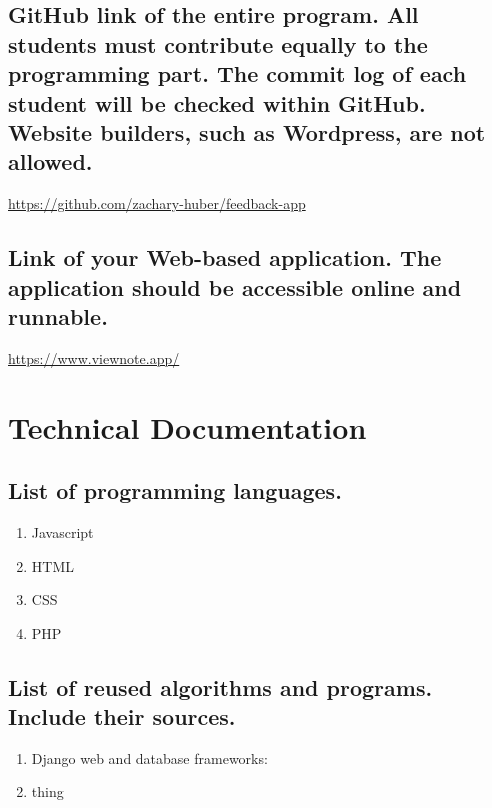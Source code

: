 \documentclass[letterpaper, 12 pt, conference]{ieeeconf}
\begin{document}
\subsection{GitHub link of the entire program. All students must contribute equally to the programming part. The commit log of each student will be checked within GitHub. Website builders, such as Wordpress, are not allowed.}
\linebreak
    \hfill \break
\url{https://github.com/zachary-huber/feedback-app}
\hfill \break

\subsection{Link of your Web-based application. The application should be accessible online and runnable.}
\linebreak
    \hfill \break
\url{https://www.viewnote.app/}
\hfill \break



\section{Technical Documentation}
\subsection{List of programming languages.}
\begin{enumerate}
   \item Javascript
   \item HTML
   \item CSS
   \item PHP
\end{enumerate}

\subsection{List of reused algorithms and programs. Include their sources.}
\begin{enumerate}
   \item  Django web and database frameworks:
   \item thing
\end{enumerate}
\end{document}
